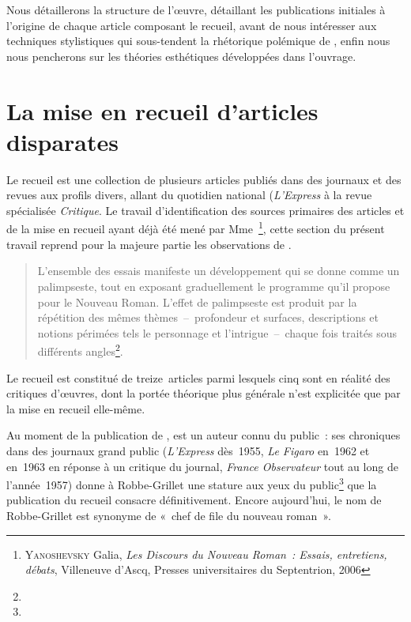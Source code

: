 \documentclass[12pt, a4paper]{article}
\begin{document}
Nous détaillerons la structure de l'œuvre, détaillant les publications initiales à l'origine de chaque article composant le recueil, avant de nous intéresser aux techniques stylistiques qui sous-tendent la rhétorique polémique de \robbe, enfin nous nous pencherons sur les théories esthétiques développées dans l'ouvrage.

\newpage

\section{La mise en recueil d'articles disparates}



Le recueil \punr est une collection de plusieurs articles publiés dans des journaux et des revues aux profils divers, allant du quotidien national (\textit{L'Express} à la revue spécialisée \textit{Critique}. Le travail d'identification des sources primaires des articles et de la mise en recueil ayant déjà été mené par Mme~\galia\footnote{\textsc{Yanoshevsky} Galia, \textit{Les Discours du Nouveau Roman~: Essais, entretiens, débats}, Villeneuve d'Ascq, Presses universitaires du Septentrion, 2006}, cette section du présent travail reprend pour la majeure partie les observations de \galia.
\begin{quote}
    L’ensemble des essais manifeste un développement qui se donne comme un palimpseste, tout en exposant graduellement le programme qu’il propose pour le Nouveau Roman. L’effet de palimpseste est produit par la répétition des mêmes thèmes~–~profondeur et surfaces, descriptions et notions périmées tels le personnage et l’intrigue~–~chaque fois traités sous différents angles\footnote{}.
\end{quote}
Le recueil est constitué de treize~articles parmi lesquels cinq sont en réalité des critiques d'œuvres, dont la portée théorique plus générale n'est explicitée que par la mise en recueil elle-même.

Au moment de la publication de \punr, \robbe{} est un auteur connu du public~: ses chroniques dans des journaux grand public (\textit{L'Express} dès~1955, \textit{Le Figaro} en~1962 et en~1963 en réponse à un critique du journal, \textit{France Observateur} tout au long de l'année~1957) donne à Robbe-Grillet une stature aux yeux du public\footnote{} que la publication du recueil consacre définitivement. Encore aujourd'hui, le nom de Robbe-Grillet est synonyme de «~chef de file du nouveau roman~».
\end{document}
